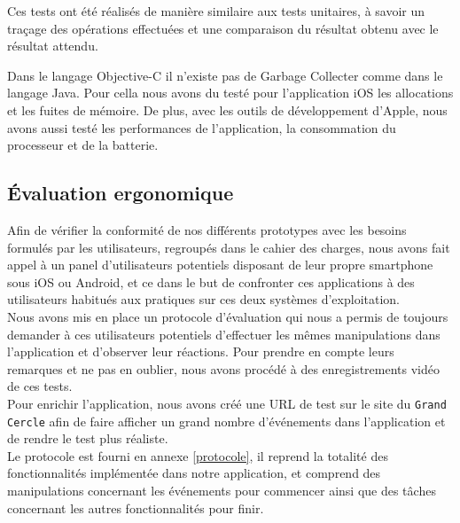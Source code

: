 \documentclass[a4paper, 11pt]{article}
\begin{document}
Ces tests ont été réalisés de manière similaire aux tests unitaires, à savoir un traçage des opérations effectuées et une comparaison du résultat obtenu avec le résultat attendu.

Dans le langage Objective-C il n'existe pas de Garbage Collecter comme dans le langage Java. Pour cella nous avons du testé pour l'application iOS les allocations et les fuites de mémoire. De plus, avec les outils de développement d'Apple, nous avons aussi testé les performances de l'application, la consommation du processeur et de la batterie.

\subsection{Évaluation ergonomique}
Afin de vérifier la conformité de nos différents prototypes avec les besoins formulés par les utilisateurs, regroupés dans le cahier des charges, nous avons fait appel à un panel d'utilisateurs potentiels disposant de leur propre smartphone sous iOS ou Android, et ce dans le but de confronter ces applications à des utilisateurs habitués aux pratiques sur ces deux systèmes d'exploitation.\\

Nous avons mis en place un protocole d'évaluation qui nous a permis de toujours demander à ces utilisateurs potentiels d'effectuer les mêmes manipulations dans l'application et d'observer leur réactions. Pour prendre en compte leurs remarques et ne pas en oublier, nous avons procédé à des enregistrements vidéo de ces tests.\\
Pour enrichir l'application, nous avons créé une URL de test sur le site du \texttt{Grand Cercle} afin de faire afficher un grand nombre d'événements dans l'application et de rendre le test plus réaliste.\\

Le protocole est fourni en annexe \ref{protocole}, il reprend la totalité des fonctionnalités implémentée dans notre application, et comprend des manipulations concernant les événements pour commencer ainsi que des tâches concernant les autres fonctionnalités pour finir.


\appendix
\addappheadtotoc

\newpage
\end{document}
